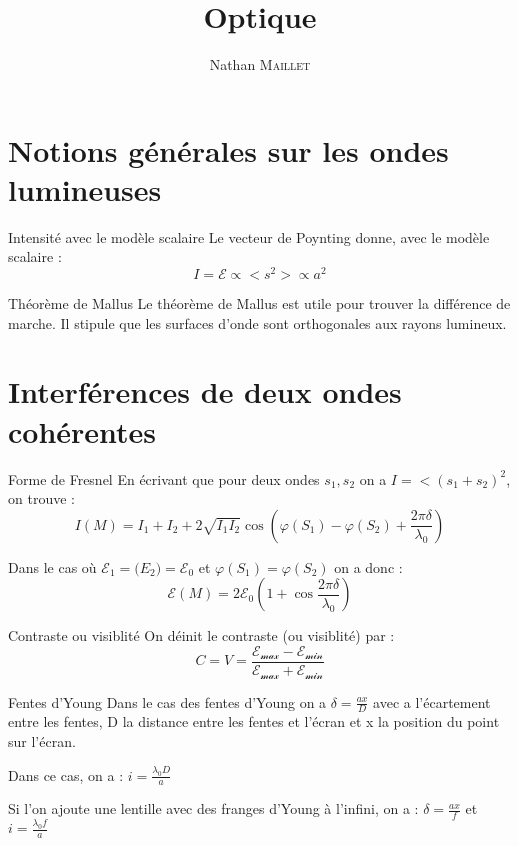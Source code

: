 \documentclass[french, a4paper, 11pt, twocolumn]{article}
\title{Optique}
\author{Nathan \textsc{Maillet}}
\date{}
\newcommand{\po}{\left(}         %
\newcommand{\pf}{\right)}        %
\newcommand{\pof}[1]{\po #1 \pf} %
\begin{document}
\maketitle

\section{Notions générales sur les ondes lumineuses}
\begin{cadre}{Intensité avec le modèle scalaire}
    Le vecteur de Poynting donne, avec le modèle scalaire :
        \[I=\mathcal{E}\propto <s^2> \propto a^2\]
\end{cadre}

\begin{cadre}{Théorème de Mallus}
    Le théorème de Mallus est utile pour trouver la différence de marche.
    Il stipule que les surfaces d'onde sont orthogonales aux rayons lumineux.    
\end{cadre}

\section{Interférences de deux ondes cohérentes}
\begin{cadre}{Forme de Fresnel}
    En écrivant que pour deux ondes \(s_1,s_2\) on a \(I=<(s_1+s_2)^2\), on trouve :
        \[I(M)=I_1+I_2+2\sqrt{I_1I_2}\cos(\varphi(S_1)-\varphi(S_2)+\frac{2\pi \delta}{\lambda_0})\]
    
    \tcblower
    Dans le cas où \(\mathcal{E_1}=\mathcal(E_2)=\mathcal{E_0}\) et \(\varphi(S_1)=\varphi(S_2)\) on a donc :
        \[\mathcal{E}(M)=2\mathcal{E_0}\pof{1+\cos{\frac{2\pi \delta}{\lambda_0}}}\]
\end{cadre}

\begin{cadre}{Contraste ou visiblité}
    On déinit le contraste (ou visiblité) par :
        \[C=V=\dfrac{\mathcal{E_{\text{max}}-E_{\text{min}}}}{\mathcal{E_{\text{max}}+E_{\text{min}}}}\]    
\end{cadre}

\begin{cadre}{Fentes d'Young}
    Dans le cas des fentes d'Young on a \(\delta=\frac{ax}{D}\) avec a l'écartement entre les fentes, D la distance entre
    les fentes et l'écran et x la position du point sur l'écran.

    Dans ce cas, on a : \(i=\frac{\lambda_0D}{a}\)

    Si l'on ajoute une lentille avec des franges d'Young à l'infini, on a : \(\delta=\frac{ax}{f}\) et \(i=\frac{\lambda_0f}{a}\)
\end{cadre}
\end{document}
